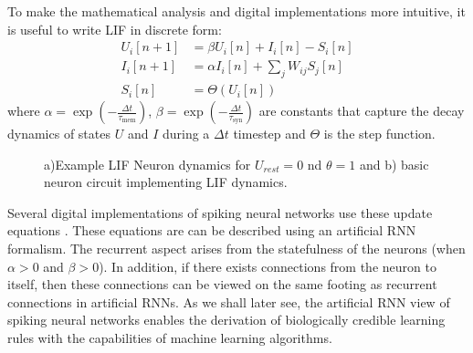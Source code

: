 \documentclass[english]{article}
\renewcommand{\cite}{\citep}
\begin{document}
To make the mathematical analysis and digital implementations more intuitive, it is useful to write \ac{LIF} in discrete form:
\begin{align*}
    U_i[n+1] & = \beta U_i[n] + I_i[n] - S_i[n]\\
    I_i[n+1] & = \alpha I_i[n] + \sum_j W_{ij} S_j[n]\\
    S_i[n] &= \Theta(U_i[n])
\end{align*}
where $\alpha=\exp(-\frac{\Delta t}{\tau_{\mathrm{mem}}})$, $\beta=\exp(-\frac{\Delta t}{\tau_{\mathrm{syn}}})$ are constants that capture the decay dynamics of states $U$ and $I$ during a $\Delta t$ timestep and $\Theta$ is the step function.
\begin{figure}
\centering
\vspace{-0.15in}
\hfil
{}
  \caption{a)Example \acl{LIF} Neuron dynamics for $U_{rest}=0$ nd $\theta=1$ and b) basic neuron circuit implementing \ac{LIF} dynamics. }
\label{SP}
\vspace{-0.05in}
\end{figure}
%
Several digital implementations of spiking neural networks use these update equations \cite{Detorakis_etal18_neursyna,Davies_etal18_loihneur}.
%
%
These equations are can be described using an artificial \ac{RNN} \cite{Neftci_etal19_surrgrad} formalism. 
The recurrent aspect arises from the statefulness of the neurons (when $\alpha>0$ and $\beta>0$). 
In addition, if there exists connections from the neuron to itself, then these connections can be viewed on the same footing as recurrent connections in artificial \acp{RNN}. 
As we shall later see, the artificial \ac{RNN} view of spiking neural networks enables the derivation of biologically credible learning rules with the capabilities of machine learning algorithms.
\end{document}

